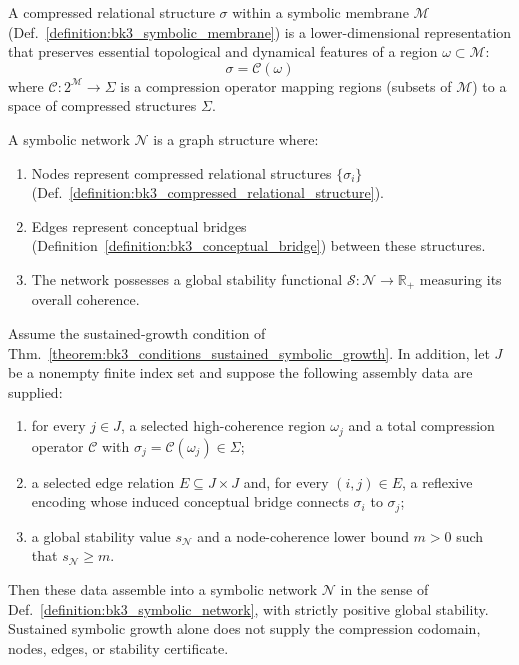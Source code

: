 \begin{definition} \label{definition:bk3_compressed_relational_structure}
A compressed relational structure $\sigma$ within a symbolic membrane $\mathcal{M}$ (Def.~\ref{definition:bk3_symbolic_membrane}) is a lower-dimensional representation that preserves essential topological and dynamical features of a region $\omega \subset \mathcal{M}$:
\[
\sigma = \mathcal{C}(\omega)
\]
where $\mathcal{C}: 2^{\mathcal{M}} \rightarrow \Sigma$ is a compression operator mapping regions (subsets of $\mathcal{M}$) to a space of compressed structures $\Sigma$.
\end{definition}

\begin{definition} \label{definition:bk3_symbolic_network}
A symbolic network $\mathcal{N}$ is a graph structure where:
\begin{enumerate}
    \item Nodes represent compressed relational structures $\{\sigma_i\}$ (Def.~\ref{definition:bk3_compressed_relational_structure}).
    \item Edges represent conceptual bridges (Definition~\ref{definition:bk3_conceptual_bridge}) between these structures.
    \item The network possesses a global stability functional $\mathcal{S}: \mathcal{N} \rightarrow \mathbb{R}_+$ measuring its overall coherence.
\end{enumerate}
\end{definition}

\begin{theorem}
\label{theorem:bk3_emergence_of_symbolic_networks}
Assume the sustained-growth condition of
Thm.~\ref{theorem:bk3_conditions_sustained_symbolic_growth}.  In addition,
let $J$ be a nonempty finite index set and suppose the following assembly data
are supplied:
\begin{enumerate}
  \item for every $j\in J$, a selected high-coherence region $\omega_j$ and a
  total compression operator $\mathcal{C}$ with
  $\sigma_j=\mathcal{C}(\omega_j)\in\Sigma$;
  \item a selected edge relation $E\subseteq J\times J$ and, for every
  $(i,j)\in E$, a reflexive encoding whose induced conceptual bridge connects
  $\sigma_i$ to $\sigma_j$;
  \item a global stability value $s_{\mathcal N}$ and a node-coherence lower
  bound $m>0$ such that $s_{\mathcal N}\geq m$.
\end{enumerate}
Then these data assemble into a symbolic network $\mathcal N$ in the sense of
Def.~\ref{definition:bk3_symbolic_network}, with strictly positive global
stability. Sustained symbolic growth alone does not supply the compression
codomain, nodes, edges, or stability certificate.
\end{theorem}

